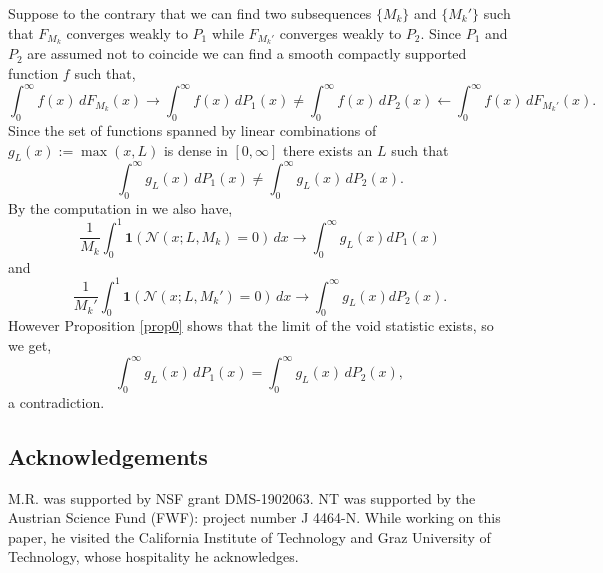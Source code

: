 \documentclass[12pt,reqno]{amsart}
\theoremstyle{plain}
\numberwithin{equation}{section}
\numberwithin{figure}{section}
\theoremstyle{plain}
\theoremstyle{definition}
\theoremstyle{remark}
\begin{document}
Suppose to the contrary that we can find two subsequences $\{M_k\}$ and $\{M_k'\}$ such that $F_{M_k}$ converges weakly to $P_1$ while $F_{M_k'}$ converges weakly to $P_2$. Since $P_1$ and $P_2$ are assumed not to coincide we can find a smooth compactly supported function $f$ such that,
$$
\int_{0}^{\infty} f(x) \,d F_{M_k} (x)
\rightarrow \int_0^{\infty} f(x) \,d P_1(x) 
\neq \int_{0}^{\infty} f(x) \,d P_{2}(x) 
\leftarrow \int_{0}^{\infty} f(x) \,d F_{M_k'}(x).
$$
Since the set of functions spanned 
by linear combinations of
$g_{L}(x) := \max(x, L)$ is dense in
$[0, \infty]$ there exists an $L$ such that
$$
\int_{0}^{\infty} g_{L}(x) \, d P_1(x) 
\neq \int_{0}^{\infty} g_{L}(x) \, d P_2(x). 
$$
By the computation in \cite{Marklof} we also have, 
$$
\frac{1}{M_k} \int_{0}^{1} 
\mathbf{1} ( \mathcal{N}(x; L, M_k) = 0 ) \, dx 
\rightarrow \int_{0}^{\infty} g_{L}(x) d P_1(x)
$$
and 
$$
\frac{1}{M_k'} \int_{0}^{1} \mathbf{1} 
( \mathcal{N}(x; L, M_k') = 0 ) \, dx
\rightarrow \int_{0}^{\infty} g_{L}(x) d P_2(x).
$$
However Proposition \ref{prop0} shows that the limit of the void statistic exists, so we get,
$$
\int_{0}^{\infty} g_{L}(x) \, d P_1(x) 
= \int_{0}^{\infty} g_{L}(x) \, d P_2(x),
$$
a contradiction. 

\subsection*{Acknowledgements}
M.R. was supported by NSF grant DMS-1902063.
NT was supported by the Austrian Science Fund (FWF): 
project number J 4464-N. 
While working on this paper, he visited
the California Institute of Technology 
and Graz University of Technology,
whose hospitality he acknowledges.


\end{document}

